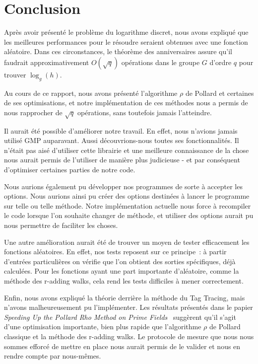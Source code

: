 \chapter*{Conclusion}
Après avoir présenté le problème du logarithme discret, nous avons expliqué que les meilleures performances pour le résoudre seraient obtenues avec une fonction aléatoire. Dans ces circonstances, le théorème des anniversaires assure qu'il faudrait approximativement $O(\sqrt{q})$ opérations dans le groupe $G$ d'ordre $q$ pour trouver $\log_g(h)$.

Au cours de ce rapport, nous avons présenté l'algorithme $\rho$ de Pollard et certaines de ses optimisations, et notre implémentation de ces méthodes nous a permis de nous rapprocher de $\sqrt{q}$ opérations, sans toutefois jamais l'atteindre.

Il aurait été possible d'améliorer notre travail. En effet, nous n'avions jamais utilisé GMP auparavant. Aussi découvrions-nous toutes ses fonctionnalités. Il n'était pas aisé d'utiliser cette librairie et une meilleure connaissance de la chose nous aurait permis de l'utiliser de manière plus judicieuse - et par conséquent d'optimiser certaines parties de notre code.

Nous aurions également pu développer nos programmes de sorte à accepter les options. Nous aurions ainsi pu créer des options destinées à lancer le programme sur telle ou telle méthode. Notre implémentation actuelle nous force à recompiler le code lorsque l'on souhaite changer de méthode, et utiliser des options aurait pu nous permettre de faciliter les choses.

Une autre amélioration aurait été de trouver un moyen de tester efficacement les fonctions aléatoires. En effet, nos tests reposent sur ce principe~: à partir d'entrées particulières on vérifie que l'on obtient des sorties spécifiques, déjà calculées. Pour les fonctions ayant une part importante d'aléatoire, comme la méthode des r-adding walks, cela rend les tests difficiles à mener correctement.

Enfin, nous avons expliqué la théorie derrière la méthode du Tag Tracing, mais n'avons malheureusement pu l'implémenter. Les résultats présentés dans le papier \textit{Speeding Up the Pollard Rho Method on Prime Fields}~\autocite[13]{pollard1} suggèrent qu'il s'agit d'une optimisation importante, bien plus rapide que l'algorithme $\rho$ de Pollard classique et la méthode des r-adding walks. Le protocole de mesure que nous nous sommes efforcé de mettre en place nous aurait permis de le valider et nous en rendre compte par nous-mêmes.
